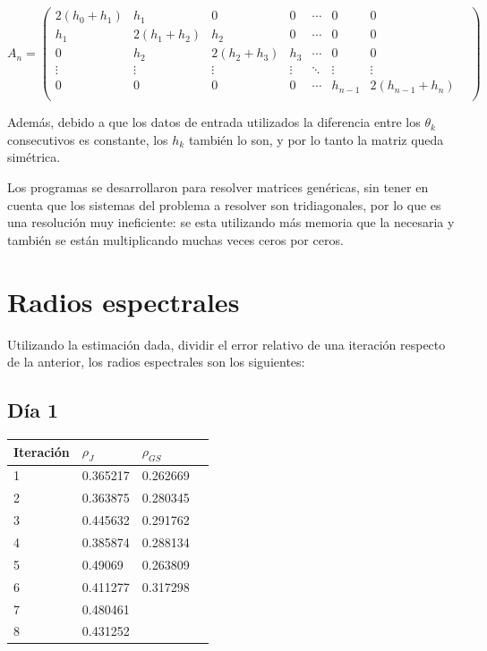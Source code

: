\documentclass[12pt,spanish]{article}
\begin{document}
\[
A_n=
  \begin{pmatrix}
   2(h_0+h_1) & h_1 & 0 &  0 & \cdots & 0 & 0 &\\
   h_1 & 2(h_1+h_2) & h_2 & 0 &  \cdots & 0 & 0 &\\
   0 & h_2 & 2(h_2+h_3) & h_3  &  \cdots & 0 & 0 &\\
   \vdots  & \vdots & \vdots & \vdots & \ddots & \vdots & \vdots &\\
   0 & 0 & 0 & 0 & \cdots & h_{n-1} & 2(h_{n-1}+h_n)\\
  \end{pmatrix}
\]

Además, debido a que los datos de entrada utilizados la diferencia entre los $\theta _k$ consecutivos es constante, los $h_k$ también lo son, y por lo tanto la matriz queda simétrica.

Los programas se desarrollaron para resolver matrices genéricas, sin tener en cuenta que los sistemas del problema a resolver son tridiagonales, por lo que es una resolución muy ineficiente: se esta utilizando más memoria que la necesaria y también se están multiplicando muchas veces ceros por ceros.

\section*{Radios espectrales}
Utilizando la estimación dada, dividir el error relativo de una iteración respecto de la anterior, los radios espectrales son los siguientes:

\subsection*{Día 1}
    \begin{tabular}{| l | l | l | l |}
    \hline
    Iteración & $\rho_J$ & $\rho_{GS}$ \\ \hline
1 & 0.365217 & 0.262669 \\
2 & 0.363875 & 0.280345 \\
3 & 0.445632 & 0.291762 \\
4 & 0.385874 & 0.288134 \\
5 & 0.49069 & 0.263809 \\
6 & 0.411277 & 0.317298 \\
7 & 0.480461 &  \\
8 & 0.431252 & \\ 
    \hline
    \end{tabular}
\end{document}

